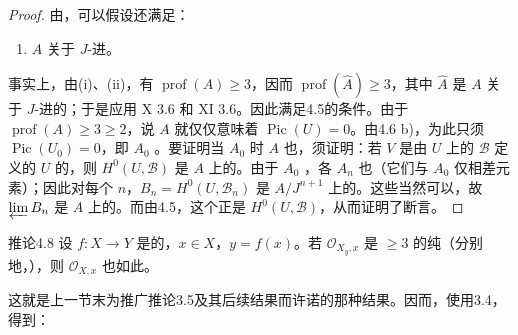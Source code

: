 \begin{proof}
由，可以假设还满足：
\begin{enumerate}
\item[(iii)] $A$ 关于 $J$-进。
\end{enumerate}
事实上，由(i)、(ii)，有 $\operatorname{prof}(A)\geq3$，因而 $\operatorname{prof}(\widehat A)\geq3$，其中 $\widehat A$ 是 $A$ 关于 $J$-进的；于是应用 X 3.6 和 XI 3.6。因此满足4.5的条件。由于 $\operatorname{prof}(A)\geq3\geq2$，说 $A$ 就仅仅意味着 $\operatorname{Pic}(U)=0$。由4.6 b)，为此只须 $\operatorname{Pic}(U_0)=0$，即 $A_0$ 。要证明当 $A_0$ 时 $A$ 也，须证明：若 $V$ 是由 $U$ 上的 $\mathcal B$ 定义的 $U$ 的，则 $H^0(U,\mathcal B)$ 是 $A$ 上的。由于 $A_0$ ，各 $A_n$ 也（它们与 $A_0$ 仅相差元素）；因此对每个 $n$，$B_n=H^0(U,\mathcal B_n)$ 是 $A/J^{n+1}$ 上的。这些当然可以，故 $\varprojlim B_n$ 是 $A$ 上的。而由4.5，这个正是 $H^0(U,\mathcal B)$，从而证明了断言。
\end{proof}
\begin{SGAresult}{推论}{4.8}
设 $f:X\to Y$ 是的，$x\in X$，$y=f(x)$。若 $\mathcal O_{X_y,x}$ 是 $\geq3$ 的纯（分别地，），则 $\mathcal O_{X,x}$ 也如此。
\end{SGAresult}
这就是上一节末为推广推论3.5及其后续结果而许诺的那种结果。因而，使用3.4，得到：
